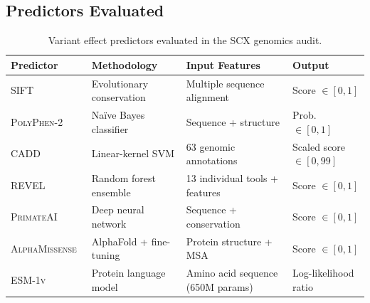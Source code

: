 \documentclass[11pt,a4paper]{article}
\theoremstyle{definition}
\newcommand{\SCX}{\textsc{SCX}}
\newcommand{\SIFT}{\textsc{SIFT}}
\newcommand{\PolyPhen}{\textsc{PolyPhen-2}}
\newcommand{\CADD}{\textsc{CADD}}
\newcommand{\REVEL}{\textsc{REVEL}}
\newcommand{\PrimateAI}{\textsc{PrimateAI}}
\newcommand{\AlphaMissense}{\textsc{AlphaMissense}}
\newcommand{\ESM}{\textsc{ESM-1v}}
\begin{document}
\subsection{Predictors Evaluated}
\begin{table}[ht]
\centering
\caption{Variant effect predictors evaluated in the \SCX{} genomics audit.}
\label{tab:predictors}
\begin{tabular}{@{}llll@{}}
\toprule
\textbf{Predictor} & \textbf{Methodology} & \textbf{Input Features} & \textbf{Output} \\
\midrule
\SIFT{}~\cite{ng2003sift} & Evolutionary conservation & Multiple sequence alignment & Score $\in [0,1]$ \\
\PolyPhen{}~\cite{adzhubei2010method} & Na\"ive Bayes classifier & Sequence + structure & Prob. $\in [0,1]$ \\
\CADD{}~\cite{kircher2014general} & Linear-kernel SVM & 63 genomic annotations & Scaled score $\in [0,99]$ \\
\REVEL{}~\cite{ioannidis2016revel} & Random forest ensemble & 13 individual tools + features & Score $\in [0,1]$ \\
\PrimateAI{}~\cite{sundaram2018predicting} & Deep neural network & Sequence + conservation & Score $\in [0,1]$ \\
\AlphaMissense{}~\cite{cheng2023accurate} & AlphaFold + fine-tuning & Protein structure + MSA & Score $\in [0,1]$ \\
\ESM{}~\cite{meier2021language} & Protein language model & Amino acid sequence (650M params) & Log-likelihood ratio \\
\bottomrule
\end{tabular}
\end{table}
\end{document}
